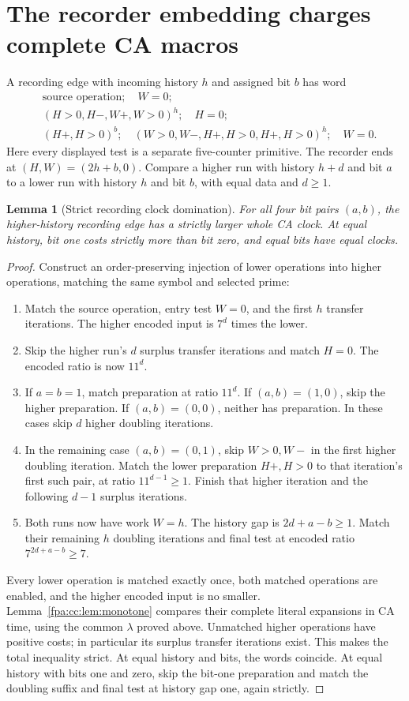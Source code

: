 \documentclass[11pt,a4paper]{article}
\numberwithin{equation}{section}
\newtheorem{lemma}[theorem]{Lemma}
\newcommand{\lam}{\lambda}
\begin{document}
\section{The recorder embedding charges complete CA macros}
\label{fpa:cc:sec:embedding}
A recording edge with incoming history $h$ and assigned bit $b$ has word
\begin{align*}
 &\text{source operation};\quad W=0;\\[-3pt]
 &(H>0,H-,W+,W>0)^h;\quad H=0;\\[-3pt]
 &(H+,H>0)^b;\quad
 (W>0,W-,H+,H>0,H+,H>0)^h;\quad W=0.
\end{align*}
Here every displayed test is a separate five-counter primitive. The recorder
ends at $(H,W)=(2h+b,0)$. Compare a higher run with history $h+d$ and bit
$a$ to a lower run with history $h$ and bit $b$, with equal data and $d\geq1$.

\begin{lemma}[Strict recording clock domination]
\label{fpa:cc:lem:record}
For all four bit pairs $(a,b)$, the higher-history recording edge has a
strictly larger whole CA clock. At equal history, bit one costs strictly
more than bit zero, and equal bits have equal clocks.
\end{lemma}
\begin{proof}
Construct an order-preserving injection of lower operations into higher
operations, matching the same symbol and selected prime:
\begin{enumerate}
\item Match the source operation, entry test $W=0$, and the first $h$
transfer iterations. The higher encoded input is $7^d$ times the lower.
\item Skip the higher run's $d$ surplus transfer iterations and match
$H=0$. The encoded ratio is now $11^d$.
\item If $a=b=1$, match preparation at ratio $11^d$. If $(a,b)=(1,0)$,
skip the higher preparation. If $(a,b)=(0,0)$, neither has preparation.
In these cases skip $d$ higher doubling iterations.
\item In the remaining case $(a,b)=(0,1)$, skip $W>0,W-$ in the first
higher doubling iteration. Match the lower preparation $H+,H>0$ to that
iteration's first such pair, at ratio $11^{d-1}\geq1$. Finish that higher
iteration and the following $d-1$ surplus iterations.
\item Both runs now have work $W=h$. The history gap is $2d+a-b\geq1$.
Match their remaining $h$ doubling iterations and final test at encoded
ratio $7^{2d+a-b}\geq7$.
\end{enumerate}
Every lower operation is matched exactly once, both matched operations are
enabled, and the higher encoded input is no smaller. Lemma~\ref{fpa:cc:lem:monotone}
compares their complete literal expansions in CA time, using the common
$\lam$ proved above. Unmatched higher operations have positive costs;
in particular its surplus transfer iterations exist. This makes the total
inequality strict. At equal history and bits, the words coincide. At equal
history with bits one and zero, skip the bit-one preparation and match
the doubling suffix and final test at history gap one, again strictly.
\end{proof}
\end{document}
